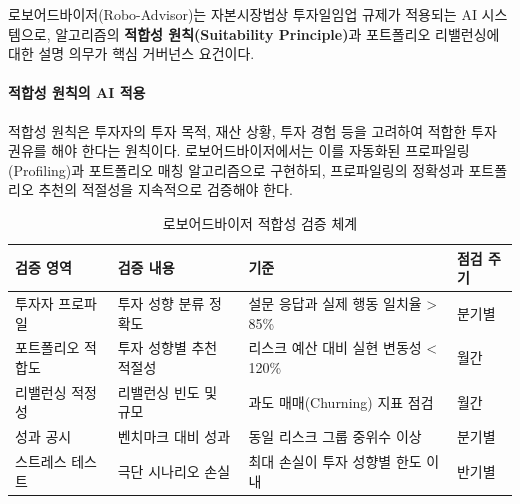 로보어드바이저(Robo-Advisor)는 자본시장법상 투자일임업 규제가 적용되는 AI 시스템으로, 알고리즘의 \textbf{적합성 원칙(Suitability Principle)}과 포트폴리오 리밸런싱에 대한 설명 의무가 핵심 거버넌스 요건이다.

\paragraph{적합성 원칙의 AI 적용}

적합성 원칙은 투자자의 투자 목적, 재산 상황, 투자 경험 등을 고려하여 적합한 투자 권유를 해야 한다는 원칙이다. 로보어드바이저에서는 이를 자동화된 프로파일링(Profiling)과 포트폴리오 매칭 알고리즘으로 구현하되, 프로파일링의 정확성과 포트폴리오 추천의 적절성을 지속적으로 검증해야 한다.

\begin{table}[htbp]
\centering
\caption{로보어드바이저 적합성 검증 체계}
\label{tab:17_robo_suit}
\begin{tabularx}{\textwidth}{p{2.5cm}Xp{3.5cm}p{2cm}}
\toprule
\textbf{검증 영역} & \textbf{검증 내용} & \textbf{기준} & \textbf{점검 주기} \\
\midrule
투자자 프로파일 & 투자 성향 분류 정확도 & 설문 응답과 실제 행동 일치율 > 85\% & 분기별 \\
포트폴리오 적합도 & 투자 성향별 추천 적절성 & 리스크 예산 대비 실현 변동성 < 120\% & 월간 \\
리밸런싱 적정성 & 리밸런싱 빈도 및 규모 & 과도 매매(Churning) 지표 점검 & 월간 \\
성과 공시 & 벤치마크 대비 성과 & 동일 리스크 그룹 중위수 이상 & 분기별 \\
스트레스 테스트 & 극단 시나리오 손실 & 최대 손실이 투자 성향별 한도 이내 & 반기별 \\
\bottomrule
\end{tabularx}
\end{table}

